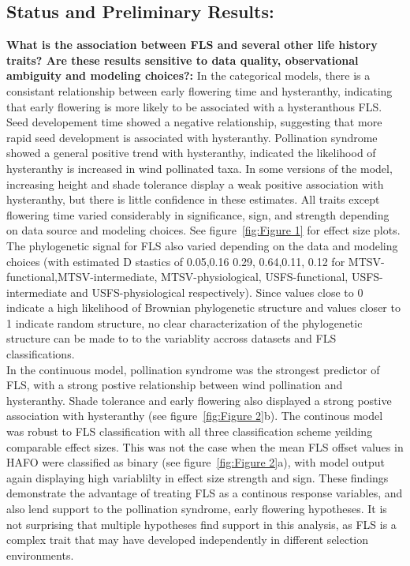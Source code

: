\documentclass[12pt]{article}\usepackage[]{graphicx}\usepackage[]{color}
\begin{document}
\subsection*{Status and Preliminary Results:}
\indent\indent\textbf{What is the association between FLS and several other life history traits?  Are these results sensitive to data quality, observational ambiguity and modeling choices?:} In the categorical models, there is a consistant relationship between early flowering time and hysteranthy, indicating that early flowering is more likely to be associated with a hysteranthous FLS. Seed developement time showed a negative relationship, suggesting that more rapid seed development is associated with hysteranthy. Pollination syndrome showed a general positive trend with hysteranthy, indicated the likelihood of hysteranthy is increased in wind pollinated taxa. In some versions of the model, increasing height and shade tolerance display a weak positive association with hysteranthy, but there is little confidence in these estimates. All traits except flowering time varied considerably in significance, sign, and strength depending on data source and modeling choices. See figure~\ref{fig:Figure 1} for effect size plots.\\
\indent The phylogenetic signal for FLS also varied depending on the data and modeling choices (with estimated D stastics of 0.05,0.16 0.29, 0.64,0.11, 0.12 for MTSV-functional,MTSV-intermediate, MTSV-physiological, USFS-functional, USFS-intermediate and USFS-physiological respectively). Since values close to 0 indicate a high likelihood of Brownian phylogenetic structure and values closer to 1 indicate random structure, no clear characterization of the phylogenetic structure can be made to to the variablity accross datasets and FLS classifications. \\
\indent In the continuous model, pollination syndrome was the strongest predictor of FLS, with a strong postive relationship between wind pollination and hysteranthy. Shade tolerance and early flowering also displayed a strong postive association with hysteranthy (see figure~\ref{fig:Figure 2}b). The continous model was robust to FLS classification with all three classification scheme yeilding comparable effect sizes. This was not the case when the mean FLS offset values in HAFO were classified as binary (see figure~\ref{fig:Figure 2}a), with model output again displaying high variablilty in effect size strength and sign. These findings demonstrate the advantage of treating FLS as a continous response variables, and also lend support to the pollination syndrome, early flowering hypotheses. It is not surprising that multiple hypotheses find support in this analysis, as FLS is a complex trait that may have developed independently in different selection environments.
\end{document}
